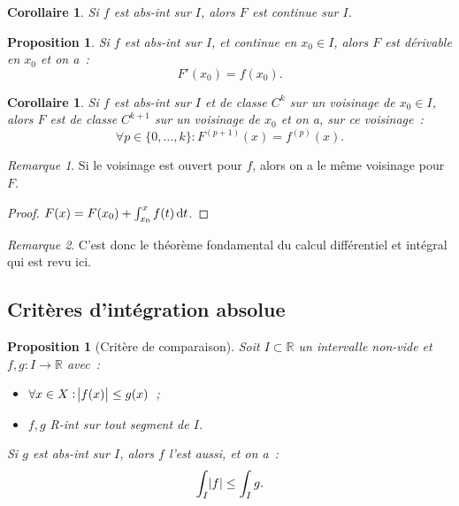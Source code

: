 \documentclass{report}
\newtheorem{prp}[thm]{Proposition}
\newtheorem{cor}[thm]{Corollaire}
\theoremstyle{definition}
\theoremstyle{remark}
\newtheorem*{rmq}{Remarque}
\numberwithin{equation}{section}
\newcommand{\R}{\mathbb R}
\begin{document}
			\begin{cor} Si $f$ est abs-int sur $I$, alors $F$ est continue sur $I$.
			\end{cor}

			\begin{prp} Si $f$ est abs-int sur $I$, et continue en $x_0 \in I$, alors $F$ est dérivable en $x_0$ et on a~:
			\begin{equation}
				F'(x_0) = f(x_0).
			\end{equation}
			\end{prp}

			\begin{cor} Si $f$ est abs-int sur $I$ et de classe $C^k$ sur un voisinage de $x_0 \in I$, alors $F$ est de classe $C^{k+1}$ sur un voisinage de
			$x_0$ et on a, sur ce voisinage~:
			\begin{equation}
				\forall p \in \{0, \ldots, k\} : F^{(p+1)}(x) = f^{(p)}(x).
			\end{equation}
			\end{cor}

			\begin{rmq} Si le voisinage est ouvert pour $f$, alors on a le même voisinage pour $F$.
			\end{rmq}

			\begin{proof} $F(x) = F(x_0) + \int_{x_0}^x f(t)\dif t$.
			\end{proof}

			\begin{rmq} C'est donc le théorème fondamental du calcul différentiel et intégral qui est revu ici.
			\end{rmq}

		\subsection{Critères d'intégration absolue}
			\begin{prp}[Critère de comparaison]\label{prp:critèredecomparaison} Soit $I \subset \R$ un intervalle non-vide et $f, g : I \to \R$ avec~:
			\begin{itemize}
				\item $\forall x \in X : \abs {f(x)} \leq g(x)$~;
				\item $f, g$ R-int sur tout segment de $I$.
			\end{itemize}

			Si $g$ est abs-int sur $I$, alors $f$ l'est aussi, et on a~:
			\begin{equation}
				\int_I\abs f \leq \int_I g.
			\end{equation}
			\end{prp}
\end{document}
